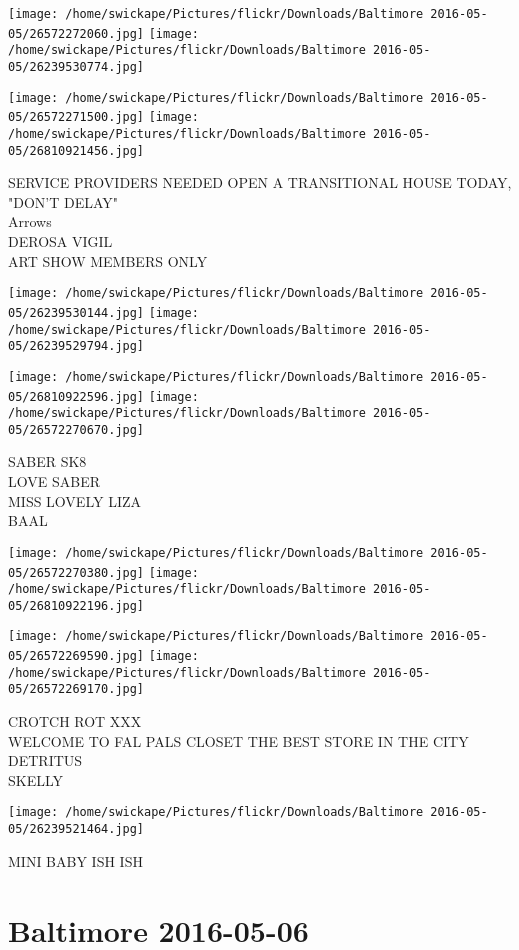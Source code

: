 \documentclass[10pt,letterpaper]{article}
\begin{document}
\texttt{[image: /home/swickape/Pictures/flickr/Downloads/Baltimore 2016-05-05/26572272060.jpg]}
\texttt{[image: /home/swickape/Pictures/flickr/Downloads/Baltimore 2016-05-05/26239530774.jpg]}

\texttt{[image: /home/swickape/Pictures/flickr/Downloads/Baltimore 2016-05-05/26572271500.jpg]}
\texttt{[image: /home/swickape/Pictures/flickr/Downloads/Baltimore 2016-05-05/26810921456.jpg]}

SERVICE PROVIDERS NEEDED OPEN A TRANSITIONAL HOUSE TODAY, "DON'T DELAY"\\
Arrows\\
DEROSA VIGIL\\
ART SHOW MEMBERS ONLY
\pagebreak

\texttt{[image: /home/swickape/Pictures/flickr/Downloads/Baltimore 2016-05-05/26239530144.jpg]}
\texttt{[image: /home/swickape/Pictures/flickr/Downloads/Baltimore 2016-05-05/26239529794.jpg]}

\texttt{[image: /home/swickape/Pictures/flickr/Downloads/Baltimore 2016-05-05/26810922596.jpg]}
\texttt{[image: /home/swickape/Pictures/flickr/Downloads/Baltimore 2016-05-05/26572270670.jpg]}

SABER SK8\\
LOVE SABER\\
MISS LOVELY LIZA\\
BAAL
\pagebreak

\texttt{[image: /home/swickape/Pictures/flickr/Downloads/Baltimore 2016-05-05/26572270380.jpg]}
\texttt{[image: /home/swickape/Pictures/flickr/Downloads/Baltimore 2016-05-05/26810922196.jpg]}

\texttt{[image: /home/swickape/Pictures/flickr/Downloads/Baltimore 2016-05-05/26572269590.jpg]}
\texttt{[image: /home/swickape/Pictures/flickr/Downloads/Baltimore 2016-05-05/26572269170.jpg]}

CROTCH ROT XXX\\
WELCOME TO FAL PALS CLOSET THE BEST STORE IN THE CITY\\
DETRITUS\\
SKELLY
\pagebreak

\texttt{[image: /home/swickape/Pictures/flickr/Downloads/Baltimore 2016-05-05/26239521464.jpg]}

MINI BABY ISH ISH
\pagebreak

\section*{Baltimore 2016-05-06}
\end{document}

